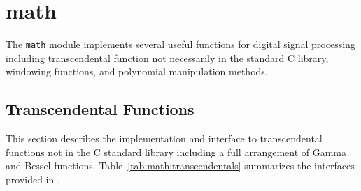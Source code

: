 % 
%

\newpage
\section{math}
\label{module:math}
The {\tt math} module implements several useful functions for digital
signal processing including transcendental function not necessarily in
the standard C library,
windowing functions,
and polynomial manipulation methods.

\subsection{Transcendental Functions}
\label{module:math:transcendentals}
This section describes the implementation and interface to
transcendental functions not in the C standard library
including a full arrangement of Gamma and Bessel functions.
Table~\ref{tab:math:transcendentals} summarizes the interfaces provided
in \liquid.

